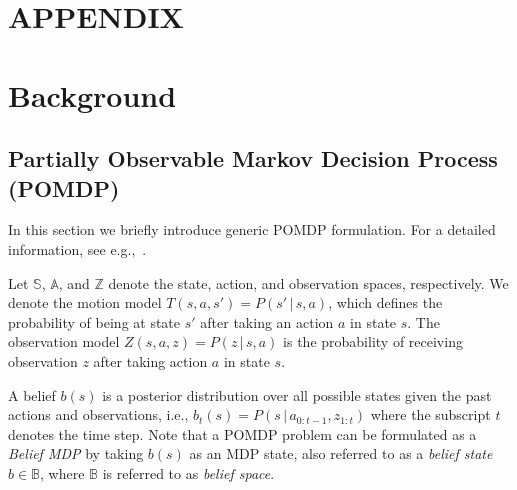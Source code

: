 \documentclass[letterpaper, 10 pt, conference]{ieeeconf}  %
\begin{document}






\section*{APPENDIX}


\section{Background}

\subsection{Partially Observable Markov Decision Process (POMDP)}


In this section we briefly introduce generic POMDP formulation.
For a detailed information, see e.g.,~\cite{Bertsekas05,TBF05,RN10}.

Let $\mathbb{S}$, $\mathbb{A}$, and $\mathbb{Z}$ denote the state, action, and observation spaces, respectively.
We denote the motion model $T(s, a, s') = P(s'\,|\,s, a)$, which defines the probability of being at state $s'$ after taking an action $a$ in state $s$.
The observation model $Z(s, a, z) = P(z\,|\,s, a)$ is the probability of receiving observation $z$ after taking action $a$ in state $s$. 

A belief $b(s)$ is a posterior distribution over all possible states given the past actions and observations, i.e., $b_{t}(s) = P(s \,|\, a_{0:t-1}, z_{1:t})$ where the subscript $t$ denotes the time step.
Note that a POMDP problem can be formulated as a \textit{Belief MDP} by taking $b(s)$ as an MDP state, also referred to as a \textit{belief state} $b \in \mathbb{B}$, where $\mathbb{B}$ is referred to as \textit{belief space}.
\end{document}
